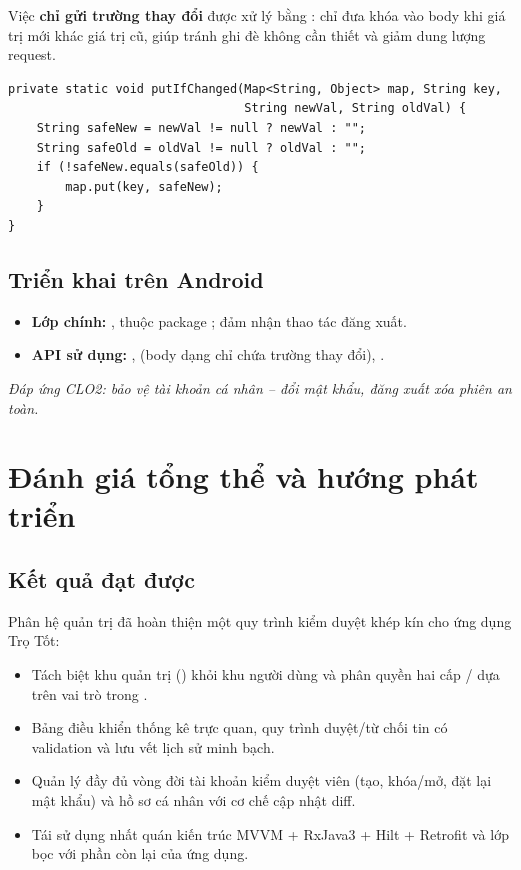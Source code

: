 Việc \textbf{chỉ gửi trường thay đổi} được xử lý bằng : chỉ
đưa khóa vào body khi giá trị mới khác giá trị cũ, giúp tránh ghi đè không cần
thiết và giảm dung lượng request.

\begin{lstlisting}[caption={Chỉ đưa vào body những trường có thay đổi}, label={lst:c6_diff}]
private static void putIfChanged(Map<String, Object> map, String key,
                                 String newVal, String oldVal) {
    String safeNew = newVal != null ? newVal : "";
    String safeOld = oldVal != null ? oldVal : "";
    if (!safeNew.equals(safeOld)) {
        map.put(key, safeNew);
    }
}
\end{lstlisting}

\subsection{Triển khai trên Android}
\begin{itemize}
    \item \textbf{Lớp chính:} ,
     thuộc package ;
     đảm nhận thao tác đăng xuất.
    \item \textbf{API sử dụng:} ,
     (body dạng  chỉ chứa trường thay
    đổi), .
\end{itemize}

\textit{Đáp ứng CLO2: bảo vệ tài khoản cá nhân -- đổi mật khẩu, đăng xuất xóa
phiên an toàn.}

\section{Đánh giá tổng thể và hướng phát triển}

\subsection{Kết quả đạt được}
Phân hệ quản trị đã hoàn thiện một quy trình kiểm duyệt khép kín cho ứng dụng
Trọ Tốt:
\begin{itemize}
    \item Tách biệt khu quản trị () khỏi khu người dùng và
    phân quyền hai cấp / dựa trên vai trò trong
    .
    \item Bảng điều khiển thống kê trực quan, quy trình duyệt/từ chối tin có
    validation và lưu vết lịch sử minh bạch.
    \item Quản lý đầy đủ vòng đời tài khoản kiểm duyệt viên (tạo, khóa/mở, đặt
    lại mật khẩu) và hồ sơ cá nhân với cơ chế cập nhật diff.
    \item Tái sử dụng nhất quán kiến trúc MVVM + RxJava3 + Hilt + Retrofit và
    lớp bọc  với phần còn lại của ứng dụng.
\end{itemize}

